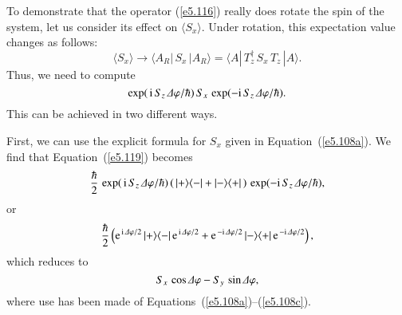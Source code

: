 To demonstrate that the operator (\ref{e5.116})  really does rotate the spin of the system,
let us consider its effect on $\langle S_x\rangle$. Under rotation, this
expectation value changes as follows:
\begin{equation}
\langle S_x\rangle \rightarrow \langle A_R| \,S_x\, |A_R \rangle
= \langle A| \,T_z^{\dag}\, S_x \,T_z \,|A\rangle.
\end{equation}
Thus, we need to compute
\begin{equation}\label{e5.119}
\exp(\,{\rm i}\,S_z\, {\mit\Delta}\varphi/\hbar)\, S_x \,
\exp(-{\rm i}\,S_z \,{\mit\Delta}\varphi/\hbar).
\end{equation}
This can be achieved in two different ways. 

First, we can use the explicit formula for $S_x$ given in Equation~(\ref{e5.108a}). We find
that Equation~(\ref{e5.119}) becomes
\begin{equation}
\frac{\hbar}{2} \,\exp(\,{\rm i}\,S_z\, {\mit\Delta}\varphi/\hbar)\,
(\,|+\rangle \langle -| + |-\rangle \langle +|\,)\,
\exp(-{\rm i}\,S_z \,{\mit\Delta}\varphi/\hbar),
\end{equation}
or 
\begin{equation}
\frac{\hbar}{2} 
\left( {\rm e}^{\,{\rm i}\,{\mit\Delta}\varphi/2}\,|+\rangle \langle -|\,
{\rm e}^{\,{\rm i}\,{\mit\Delta}\varphi/2} + {\rm e}^{\,-{\rm i}\,{\mit\Delta}\varphi/2}
\,|-\rangle \langle +|\,{\rm e}^{\,-{\rm i}\,{\mit\Delta}\varphi/2}\right),
\end{equation}
which reduces to
\begin{equation}
S_x\,\cos{\mit\Delta}\varphi - S_y\,\sin{\mit\Delta}\varphi,
\end{equation}
where use has been made of Equations~(\ref{e5.108a})--(\ref{e5.108c}).

